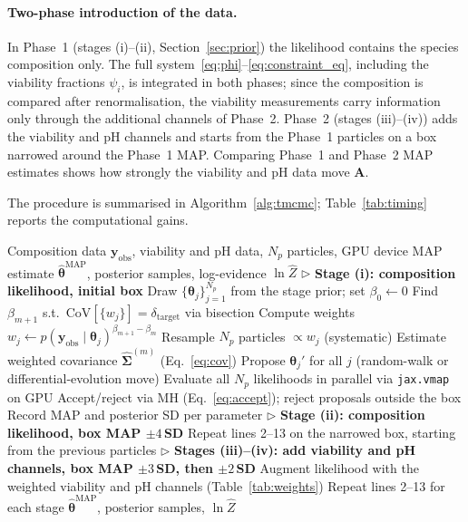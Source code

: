 \documentclass[pdflatex,sn-mathphys-num,lineno]{sn-jnl}
\newcommand{\btheta}{\boldsymbol{\theta}}
\newcommand{\yobs}{\mathbf{y}_{\mathrm{obs}}}
\begin{document}
\paragraph{Two-phase introduction of the data.}
In Phase~1 (stages (i)--(ii), Section~\ref{sec:prior}) the likelihood contains the species composition only.
The full system~\eqref{eq:phi}--\eqref{eq:constraint_eq}, including the viability fractions $\psi_i$, is integrated in both phases; since the composition is compared after renormalisation, the viability measurements carry information only through the additional channels of Phase~2.
Phase~2 (stages (iii)--(iv)) adds the viability and pH channels and starts from the Phase~1 particles on a box narrowed around the Phase~1 MAP.
Comparing Phase~1 and Phase~2 MAP estimates shows how strongly the viability and pH data move $\mathbf{A}$.

The procedure is summarised in Algorithm~\ref{alg:tmcmc}; Table~\ref{tab:timing} reports the computational gains.

\begin{algorithm}[t]
\caption{Staged GPU-accelerated TMCMC (one seed; every stage is run with three seeds and checked as in Section~\ref{sec:convergence})}
\label{alg:tmcmc}
\begin{algorithmic}[1]
\REQUIRE Composition data $\yobs$, viability and pH data, $N_p$ particles, GPU device
\ENSURE MAP estimate $\hat{\btheta}^{\mathrm{MAP}}$, posterior samples, log-evidence $\ln\hat{Z}$
\STATE $\triangleright$ \textbf{Stage (i): composition likelihood, initial box}
\STATE Draw $\{\btheta_j\}_{j=1}^{N_p}$ from the stage prior; set $\beta_0\leftarrow 0$
    \STATE Find $\beta_{m+1}$ s.t.\ $\mathrm{CoV}[\{w_j\}]=\delta_{\mathrm{target}}$ via bisection
    \STATE Compute weights $w_j \leftarrow p(\yobs\mid\btheta_j)^{\beta_{m+1}-\beta_m}$
    \STATE Resample $N_p$ particles $\propto w_j$ (systematic)
    \STATE Estimate weighted covariance $\hat{\boldsymbol{\Sigma}}^{(m)}$ (Eq.~\ref{eq:cov})
        \STATE Propose $\btheta_{j}'$ for all $j$ (random-walk or differential-evolution move)
        \STATE Evaluate all $N_p$ likelihoods in parallel via \texttt{jax.vmap} on GPU
        \STATE Accept/reject via MH (Eq.~\ref{eq:accept}); reject proposals outside the box
    \ENDFOR
\ENDWHILE
\STATE Record MAP and posterior SD per parameter
\STATE $\triangleright$ \textbf{Stage (ii): composition likelihood, box MAP $\pm4$\,SD}
\STATE Repeat lines 2--13 on the narrowed box, starting from the previous particles
\STATE $\triangleright$ \textbf{Stages (iii)--(iv): add viability and pH channels, box MAP $\pm3$\,SD, then $\pm2$\,SD}
\STATE Augment likelihood with the weighted viability and pH channels (Table~\ref{tab:weights})
\STATE Repeat lines 2--13 for each stage
\RETURN $\hat{\btheta}^{\mathrm{MAP}}$, posterior samples, $\ln\hat{Z}$
\end{algorithmic}
\end{algorithm}
\end{document}
